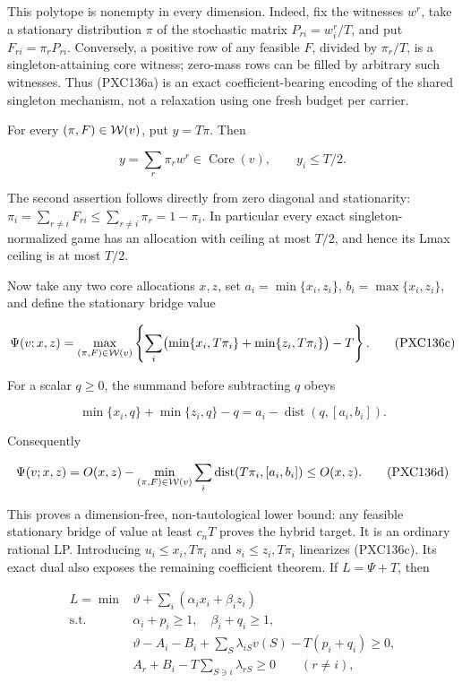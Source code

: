 \documentclass[11pt]{article}
\newcommand{\core}{\operatorname{Core}}
\begin{document}
This polytope is nonempty in every dimension.  Indeed, fix the witnesses
\(w^r\), take a stationary distribution \(\pi\) of the stochastic matrix
\(P_{ri}=w^r_i/T\), and put \(F_{ri}=\pi_rP_{ri}\).  Conversely, a positive
row of any feasible \(F\), divided by \(\pi_r/T\), is a singleton-attaining
core witness; zero-mass rows can be filled by arbitrary such witnesses.
Thus (PXC136a) is an exact coefficient-bearing encoding of the shared
singleton mechanism, not a relaxation using one fresh budget per carrier.

For every \((\pi,F)\in{\cal W}(v)\), put \(y=T\pi\).  Then

\[
 y=\sum_r\pi_rw^r\in\core(v),\qquad y_i\le T/2.          \tag{PXC136b}
\]

The second assertion follows directly from zero diagonal and stationarity:
\(\pi_i=\sum_{r\ne i}F_{ri}\le\sum_{r\ne i}\pi_r=1-\pi_i\).
In particular every exact singleton-normalized game has an allocation with
ceiling at most \(T/2\), and hence its Lmax ceiling is at most \(T/2\).

Now take any two core allocations \(x,z\), set
\(a_i=\min\{x_i,z_i\}\), \(b_i=\max\{x_i,z_i\}\), and define the stationary
bridge value

\[
 \Psi(v;x,z)=\max_{(\pi,F)\in{\cal W}(v)}
 \left\{\sum_i\bigl(\min\{x_i,T\pi_i\}
        +\min\{z_i,T\pi_i\}\bigr)-T\right\}.             \tag{PXC136c}
\]

For a scalar \(q\ge0\), the summand before subtracting \(q\) obeys

\[
 \min\{x_i,q\}+\min\{z_i,q\}-q
 =a_i-\operatorname{dist}(q,[a_i,b_i]).
\]

Consequently

\[
 \Psi(v;x,z)
 =O(x,z)-\min_{(\pi,F)\in{\cal W}(v)}
       \sum_i\operatorname{dist}(T\pi_i,[a_i,b_i])
 \le O(x,z).                                             \tag{PXC136d}
\]

This proves a dimension-free, non-tautological lower bound: any feasible
stationary bridge of value at least \(c_nT\) proves the hybrid target.  It is
an ordinary rational LP.  Introducing \(u_i\le x_i,T\pi_i\) and
\(s_i\le z_i,T\pi_i\) linearizes (PXC136c).  Its exact dual also exposes the
remaining coefficient theorem.  If \(L=\Psi+T\), then

\begin{align}
L=\min &\vartheta+\sum_i(\alpha_ix_i+\beta_iz_i)\\
\text{s.t. }&\alpha_i+p_i\ge1,\quad\beta_i+q_i\ge1,\\
&\vartheta-A_i-B_i+\sum_S\lambda_{iS}v(S)
       -T(p_i+q_i)\ge0,\\
&A_r+B_i-T\sum_{S\ni i}\lambda_{rS}\ge0\qquad(r\ne i),
                                                               \tag{PXC136e}
\end{align}
\end{document}
